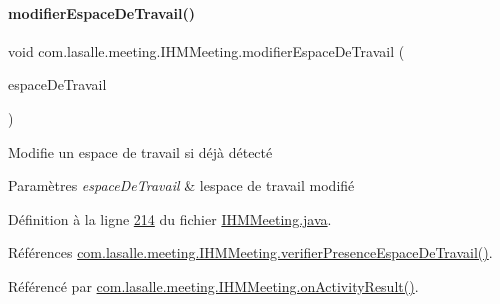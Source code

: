 \mbox{\label{classcom_1_1lasalle_1_1meeting_1_1_i_h_m_meeting_a3367c0a9b9743ca7808cb2265789f9b8}} 
\paragraph{\texorpdfstring{modifier\+Espace\+De\+Travail()}{modifierEspaceDeTravail()}}
{\footnotesize\ttfamily void com.\+lasalle.\+meeting.\+I\+H\+M\+Meeting.\+modifier\+Espace\+De\+Travail (\begin{DoxyParamCaption}\item[{\hyperlink{classcom_1_1lasalle_1_1meeting_1_1_espace_de_travail}{Espace\+De\+Travail}}]{espace\+De\+Travail }\end{DoxyParamCaption})\hspace{0.3cm}{\ttfamily [private]}}



Modifie un espace de travail si déjà détecté 


\begin{DoxyParams}{Paramètres}
{\em espace\+De\+Travail} & l\textquotesingle{}espace de travail modifié \\
\hline
\end{DoxyParams}


Définition à la ligne \hyperlink{_i_h_m_meeting_8java_source_l00214}{214} du fichier \hyperlink{_i_h_m_meeting_8java_source}{I\+H\+M\+Meeting.\+java}.



Références \hyperlink{_i_h_m_meeting_8java_source_l00248}{com.\+lasalle.\+meeting.\+I\+H\+M\+Meeting.\+verifier\+Presence\+Espace\+De\+Travail()}.



Référencé par \hyperlink{_i_h_m_meeting_8java_source_l00297}{com.\+lasalle.\+meeting.\+I\+H\+M\+Meeting.\+on\+Activity\+Result()}.


